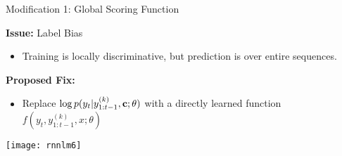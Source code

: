 \begin{frame}{Modification 1: Global Scoring Function  }

  \textbf{Issue:} Label Bias
    \begin{itemize}
    \item Training is locally discriminative, but prediction is over entire sequences.
    \end{itemize}


    \air

  \textbf{Proposed Fix:}

  \begin{itemize}
  \item Replace $ \log p(y_{t} | y^{(k)}_{1:t-1}, \mathbf{c}; \theta)$ with
    a directly learned function $f(y_t, y_{1:t-1}^{(k)}, x; \theta)$
  \end{itemize}
  \air

  \begin{center}
    \texttt{[image: rnnlm6]}
  \end{center}
\end{frame}

